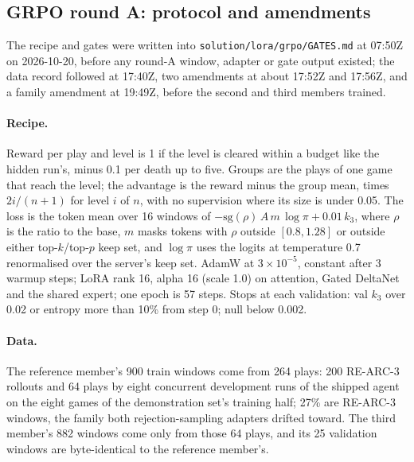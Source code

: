 \subsection{GRPO round A: protocol and amendments}

The recipe and gates were written into \texttt{solution/lora/grpo/GATES.md} at 07:50Z on 2026-10-20, before any round-A window, adapter or gate output existed; the data record followed at 17:40Z, two amendments at about 17:52Z and 17:56Z, and a family amendment at 19:49Z, before the second and third members trained. %

\paragraph{Recipe.}
Reward per play and level is 1 if the level is cleared within a budget like the hidden run's, minus 0.1 per death up to five. %
Groups are the plays of one game that reach the level; the advantage is the reward minus the group mean, times $2i/(n+1)$ for level $i$ of $n$, with no supervision where its size is under 0.05. %
The loss is the token mean over 16 windows of $-\mathrm{sg}(\rho)\,A\,m\,\log\pi + 0.01\,k_3$, where $\rho$ is the ratio to the base, $m$ masks tokens with $\rho$ outside $[0.8, 1.28]$ or outside either top-$k$/top-$p$ keep set, and $\log\pi$ uses the logits at temperature 0.7 renormalised over the server's keep set. %
AdamW at $3\times10^{-5}$, constant after 3 warmup steps; LoRA rank 16, alpha 16 (scale 1.0) on attention, Gated DeltaNet and the shared expert; one epoch is 57 steps. %
Stops at each validation: val $k_3$ over 0.02 or entropy more than 10\% from step 0; null below 0.002. %

\paragraph{Data.}
The reference member's 900 train windows come from 264 plays: 200 RE-ARC-3 rollouts and 64 plays by eight concurrent development runs of the shipped agent on the eight games of the demonstration set's training half; 27\% are RE-ARC-3 windows, the family both rejection-sampling adapters drifted toward. %
The third member's 882 windows come only from those 64 plays, and its 25 validation windows are byte-identical to the reference member's. %

